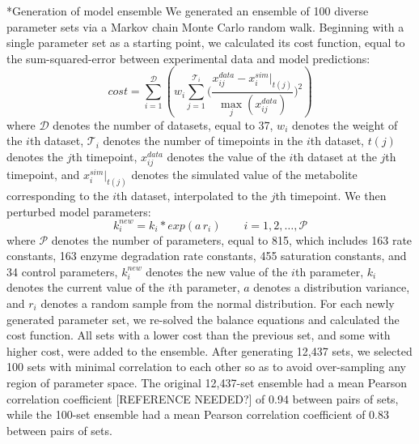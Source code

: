\documentclass[12pt]{article}
\makeatletter
\renewcommand\subsection{\@startsection
	{subsection}{2}{0mm}
	{-0.05in}
	{-0.5\baselineskip}
	{\normalfont\normalsize\bfseries}}
\makeatother
\begin{document}
\subsection*{Generation of model ensemble}
We generated an ensemble of 100 diverse parameter sets via a Markov chain Monte Carlo random walk.
Beginning with a single parameter set as a starting point, we calculated its cost function, equal to the sum-squared-error between experimental data and model predictions:
\begin{equation}\label{eqn:cost-function}
    cost=\sum_{i=1}^{\mathcal{D}}\left(w_i\sum_{j=1}^{\mathcal{T}_i}\bigg(\frac{x_{ij}^{data}-x_{i}^{sim}|_{t(j)}}{\max\limits_{j}\left(x_{ij}^{data}\right)}\bigg)^2 \right)
\end{equation}
where $\mathcal{D}$ denotes the number of datasets, equal to 37, $w_i$ denotes the weight of the $i$th dataset, $\mathcal{T}_i$ denotes the number of timepoints in the $i$th dataset, $t(j)$ denotes the $j$th timepoint, $x_{ij}^{data}$ denotes the value of the $i$th dataset at the $j$th timepoint, and $x_{i}^{sim}|_{t(j)}$ denotes the simulated value of the metabolite corresponding to the $i$th dataset, interpolated to the $j$th timepoint.
We then perturbed model parameters:
\begin{equation}\label{eqn:parameter-perturbation}
    k_i^{new}=k_i*exp(a\,r_i)\qquad{i=1,2,\hdots,\mathcal{P}}
\end{equation}
where $\mathcal{P}$ denotes the number of parameters, equal to 815, which includes 163 rate constants, 163 enzyme degradation rate constants, 455 saturation constants, and 34 control parameters, $k_i^{new}$ denotes the new value of the $i$th parameter, $k_i$ denotes the current value of the $i$th parameter, $a$ denotes a distribution variance, and $r_i$ denotes a random sample from the normal distribution.
For each newly generated parameter set, we re-solved the balance equations and calculated the cost function.
All sets with a lower cost than the previous set, and some with higher cost, were added to the ensemble.
After generating 12,437 sets, we selected 100 sets with minimal correlation to each other so as to avoid over-sampling any region of parameter space.
The original 12,437-set ensemble had a mean Pearson correlation coefficient [REFERENCE NEEDED?] of 0.94 between pairs of sets, while the 100-set ensemble had a mean Pearson correlation coefficient of 0.83 between pairs of sets.
\end{document}

